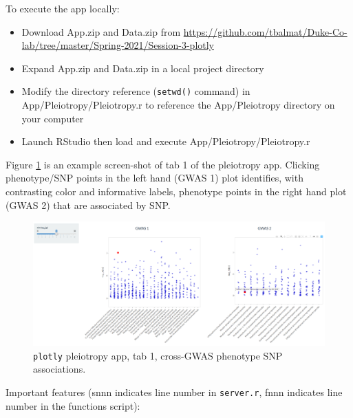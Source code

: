 \documentclass[10pt, letterpaper]{article}
\begin{document}
\begin{spacing}{1.0}
To execute the app locally:

\begin{itemize}[noitemsep]
    \item Download App.zip and Data.zip from \small \url{https://github.com/tbalmat/Duke-Co-lab/tree/master/Spring-2021/Session-3-plotly} \normalsize
    \item Expand App.zip and Data.zip in a local project directory
    \item Modify the directory reference (\texttt{setwd()} command) in App/Pleiotropy/Pleiotropy.r to reference the App/Pleiotropy directory on your computer
    \item Launch RStudio then load and execute App/Pleiotropy/Pleiotropy.r
\end{itemize}

\vspace{0.1in}

Figure \ref{fg:tab1} is an example screen-shot of tab 1 of the pleiotropy app.  Clicking phenotype/SNP points in the left hand (GWAS 1) plot identifies, with contrasting color and informative labels, phenotype points in the right hand plot (GWAS 2) that are associated by SNP. 

\begin{figure}[H]
    \includegraphics[width=6.5in, trim={0 0 0 0}, clip]{Tab1.png}
    \centering
    \caption{\texttt{plotly} pleiotropy app, tab 1, cross-GWAS phenotype SNP associations.}
    \label{fg:tab1}
\end{figure}


Important features (snnn indicates line number in \texttt{server.r}, fnnn indicates line number in the functions script):


\end{spacing}
\end{document}
